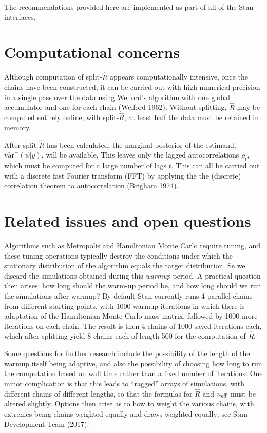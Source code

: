 \documentclass[11pt]{article}
\begin{document}
The recommendations provided here are implemented as part of all of the Stan interfaces.

\section{Computational concerns}

Although computation of split-$\widehat{R}$ appears computationally intensive, once the chains have been constructed, it can be carried out with high numerical precision in a single pass over the data using Welford's algorithm with one global accumulator and one for each chain (Welford 1962).  Without splitting, $\widehat{R}$ may be computed entirely online; with split-$\widehat{R}$, at least half the data must be retained in memory.

After split-$\widehat{R}$ has been calculated, the marginal posterior of the estimand, $\widehat{\mathrm{var}}^+(\psi | y)$, will be available.  This leaves only the lagged autocorrelations $\rho_t$, which must be computed for a large number of lags $t$. This can all be carried out with a discrete fast Fourier transform (FFT) by applying the the (discrete) correlation theorem to autocorrelation (Brigham 1974).

\section{Related issues and open questions}

\label{warmup}Algorithms such as Metropolis and Hamiltonian Monte Carlo require tuning, and these tuning operations typically destroy the conditions under which the stationary distribution of the algorithm equals the target distribution.  Se we discard the simulations obtained during this {\em warmup} period.  A practical question then arises:  how long should the warm-up period be, and how long should we run the simulations after warmup?  By default Stan currently runs 4 parallel chains from different starting points, with 1000 warmup iterations in which there is adaptation of the Hamiltonian Monte Carlo mass matrix, followed by 1000 more iterations on each chain.  The result is then 4 chains of 1000 saved iterations each, which after splitting yield 8 chains each of length 500 for the computation of $\widehat{R}$.

Some questions for further research include the possibility of the length of the warmup itself being adaptive, and also the possibility of choosing how long to run the computation based on wall time rather than a fixed number of iterations.  One minor complication is that this leads to ``ragged'' arrays of simulations, with different chains of different lengths, so that the formulas for $\widehat{R}$ and $n_{\rm eff}$ must be altered slightly.  Options then arise as to how to weight the various chains, with extremes being chains weighted equally and draws weighted equally; see Stan Development Team (2017).
\end{document}

